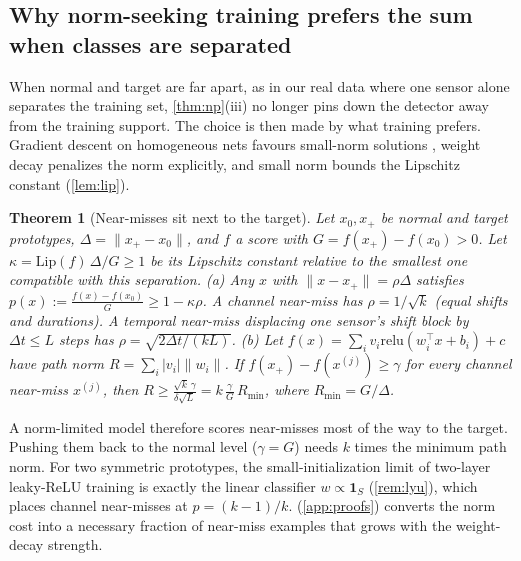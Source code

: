 \documentclass{article}
\newtheorem{theorem}{Theorem}
\theoremstyle{definition}
\theoremstyle{remark}
\renewcommand{\1}{\mathbf{1}}
\newcommand{\Lip}{\mathrm{Lip}}
\newcommand{\relu}{\mathrm{relu}}
\begin{document}
\subsection{Why norm-seeking training prefers the sum when classes are separated}
\label{sec:separated}
When normal and target are far apart, as in our real data where one sensor alone separates the training set, \cref{thm:np}(iii) no longer pins down the detector away from the training support. The choice is then made by what training prefers. Gradient descent on homogeneous nets favours small-norm solutions \citep{lyu2020,ji2020}, weight decay penalizes the norm explicitly, and small norm bounds the Lipschitz constant (\cref{lem:lip}).
\begin{theorem}[Near-misses sit next to the target]\label{thm:sep}
Let $x_0,x_+$ be normal and target prototypes, $\Delta=\|x_+-x_0\|$, and $f$ a score with $G=f(x_+)-f(x_0)>0$. Let $\kappa=\Lip(f)\,\Delta/G\ge1$ be its Lipschitz constant relative to the smallest one compatible with this separation.
(a) Any $x$ with $\|x-x_+\|=\rho\Delta$ satisfies $p(x):=\frac{f(x)-f(x_0)}{G}\ge1-\kappa\rho$. A channel near-miss has $\rho=1/\sqrt{k}$ (equal shifts and durations). A temporal near-miss displacing one sensor's shift block by $\Delta t\le L$ steps has $\rho=\sqrt{2\Delta t/(kL)}$.
(b) Let $f(x)=\sum_iv_i\relu(w_i^\top x+b_i)+c$ have path norm $R=\sum_i|v_i|\|w_i\|$. If $f(x_+)-f(x^{(j)})\ge\gamma$ for every channel near-miss $x^{(j)}$, then $R\ge\frac{\sqrt k\,\gamma}{\delta\sqrt L}=k\,\frac{\gamma}{G}\,R_{\min}$, where $R_{\min}=G/\Delta$.
\end{theorem}
A norm-limited model therefore scores near-misses most of the way to the target. Pushing them back to the normal level ($\gamma=G$) needs $k$ times the minimum path norm. For two symmetric prototypes, the small-initialization limit of two-layer leaky-ReLU training \citep{lyu2021} is exactly the linear classifier $w\propto\1_S$ (\cref{rem:lyu}), which places channel near-misses at $p=(k-1)/k$.  (\cref{app:proofs}) converts the norm cost into a necessary fraction of near-miss examples that grows with the weight-decay strength.
\end{document}
